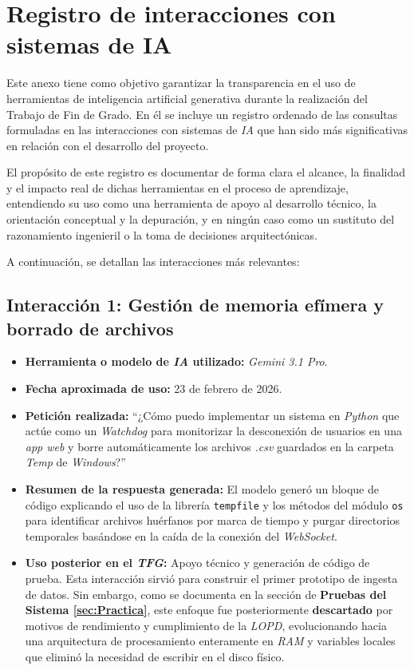 
\section{Registro de interacciones con sistemas de IA}
Este anexo tiene como objetivo garantizar la transparencia en el uso de herramientas de inteligencia artificial generativa durante la realización del Trabajo de Fin de Grado. En él se incluye un registro ordenado de las consultas formuladas en las interacciones con sistemas de \textit{IA} que han sido más significativas en relación con el desarrollo del proyecto.

El propósito de este registro es documentar de forma clara el alcance, la finalidad y el impacto real de dichas herramientas en el proceso de aprendizaje, entendiendo su uso como una herramienta de apoyo al desarrollo técnico, la orientación conceptual y la depuración, y en ningún caso como un sustituto del razonamiento ingenieril o la toma de decisiones arquitectónicas.

A continuación, se detallan las interacciones más relevantes:

\subsection{Interacción 1: Gestión de memoria efímera y borrado de archivos}
\begin{itemize}
    \item \textbf{Herramienta o modelo de \textit{IA} utilizado:} \textit{Gemini 3.1 Pro}.
    \item \textbf{Fecha aproximada de uso:} 23 de febrero de 2026.
    \item \textbf{Petición realizada:} ``¿Cómo puedo implementar un sistema en \textit{Python} que actúe como un \textit{Watchdog} para monitorizar la desconexión de usuarios en una \textit{app web} y borre automáticamente los archivos \textit{.csv} guardados en la carpeta \textit{Temp} de \textit{Windows}?''
    \item \textbf{Resumen de la respuesta generada:} El modelo generó un bloque de código explicando el uso de la librería \texttt{tempfile} y los métodos del módulo \texttt{os} para identificar archivos huérfanos por marca de tiempo y purgar directorios temporales basándose en la caída de la conexión del \textit{WebSocket}.
    \item \textbf{Uso posterior en el \textit{TFG}:} Apoyo técnico y generación de código de prueba. Esta interacción sirvió para construir el primer prototipo de ingesta de datos. Sin embargo, como se documenta en la sección de \textbf{Pruebas del Sistema \ref{sec:Practica}}, este enfoque fue posteriormente \textbf{descartado} por motivos de rendimiento y cumplimiento de la \textit{LOPD}, evolucionando hacia una arquitectura de procesamiento enteramente en \textit{RAM} y variables locales que eliminó la necesidad de escribir en el disco físico.
\end{itemize}


